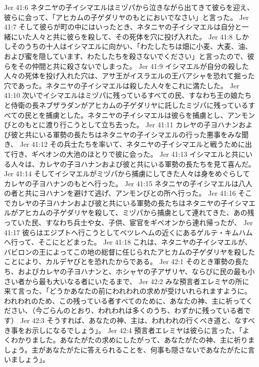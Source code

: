 Jer 41:6  ネタニヤの子イシマエルはミヅパから泣きながら出てきて彼らを迎え、彼らに会って、「アヒカムの子ゲダリヤのもとにおいでなさい」と言った。
Jer 41:7  そして彼らが町の中にはいったとき、ネタニヤの子イシマエルは自分と一緒にいた人々と共に彼らを殺して、その死体を穴に投げ入れた。
Jer 41:8  しかしそのうちの十人はイシマエルに向かい、「わたしたちは畑に小麦、大麦、油、および蜜を隠しています、わたしたちを殺さないでください」と言ったので、彼らをその仲間と共に殺さないでしまった。
Jer 41:9  イシマエルが自分の殺した人々の死体を投げ入れた穴は、アサ王がイスラエルの王バアシャを恐れて掘った穴であった。ネタニヤの子イシマエルは殺した人々をこれに満たした。
Jer 41:10  次いでイシマエルはミヅパに残っているすべての民、すなわち王の娘たちと侍衛の長ネブザラダンがアヒカムの子ゲダリヤに託したミヅパに残っているすべての民とを捕虜とした。ネタニヤの子イシマエルは彼らを捕虜とし、アンモンびとのもとに渡り行こうとして立ち去った。
Jer 41:11  カレヤの子ヨハナンおよび彼と共にいる軍勢の長たちはネタニヤの子イシマエルの行った悪事をみな聞き、
Jer 41:12  その兵士たちを率いて、ネタニヤの子イシマエルと戦うために出て行き、ギベオンの大池のほとりで彼に会った。
Jer 41:13  イシマエルと共にいる人々は、カレヤの子ヨハナンおよび彼と共にいる軍勢の長たちを見て喜んだ。
Jer 41:14  そしてイシマエルがミヅパから捕虜にしてきた人々は身をめぐらしてカレヤの子ヨハナンのもとへ行った。
Jer 41:15  ネタニヤの子イシマエルは八人の者と共にヨハナンを避けて逃げ、アンモンびとの所へ行った。
Jer 41:16  そこでカレヤの子ヨハナンおよび彼と共にいる軍勢の長たちはネタニヤの子イシマエルがアヒカムの子ゲダリヤを殺して、ミヅパから捕虜として連れてきた、あの残っていた民、すなわち兵士や女、子供、宦官をギベオンから連れ帰ったが、
Jer 41:17  彼らはエジプトへ行こうとしてベツレヘムの近くにあるゲルテ・キムハムへ行って、そこにとどまった。
Jer 41:18  これは、ネタニヤの子イシマエルが、バビロンの王によってこの地の総督に任じられたアヒカムの子ゲダリヤを殺したことにより、カルデヤびとを恐れたからである。
Jer 42:1  そのとき軍勢の長たち、およびカレヤの子ヨハナンと、ホシャヤの子アザリヤ、ならびに民の最も小さい者から最も大いなる者にいたるまで、
Jer 42:2  みな預言者エレミヤの所に来て言った、「どうかあなたの前にわれわれの求めが受けいれられますように。われわれのため、この残っている者すべてのために、あなたの神、主に祈ってください、（今ごらんのとおり、われわれは多くのうち、わずかに残っている者です）
Jer 42:3  そうすれば、あなたの神、主は、われわれの行くべき道と、なすべき事をお示しになるでしょう」。
Jer 42:4  預言者エレミヤは彼らに言った、「よくわかりました。あなたがたの求めにしたがって、あなたがたの神、主に祈りましょう。主があなたがたに答えられることを、何事も隠さないであなたがたに言いましょう」。
